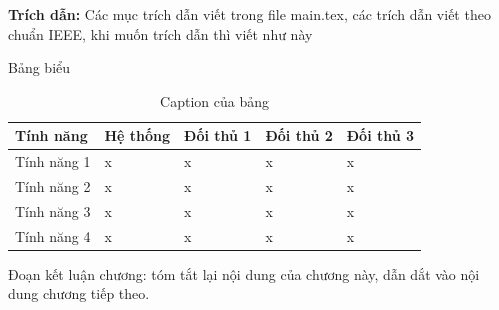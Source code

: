\FloatBarrier

\vspace{1cm}

\textbf{Trích dẫn:} Các mục trích dẫn viết trong file main.tex, các trích dẫn viết theo chuẩn IEEE, khi muốn trích dẫn thì viết như này \cite{Cockburn2005}



\begin{landscape}
	\noindent Bảng biểu

	\begin{longtable}{|>{\raggedright\arraybackslash}m{4cm}|>{\raggedright\arraybackslash}m{4.5cm}|>{\raggedright\arraybackslash}m{4.5cm}|>{\raggedright\arraybackslash}m{4.5cm}|>{\raggedright\arraybackslash}m{4.5cm}|}
	\caption{Caption của bảng} \\
	\hline
	\textbf{Tính năng} & \textbf{Hệ thống} & \textbf{Đối thủ 1} & \textbf{Đối thủ 2} & \textbf{Đối thủ 3} \\
	\hline
	Tính năng 1 & x & x & x & x \\
	\hline
	Tính năng 2 & x & x & x & x \\
	\hline
	Tính năng 3 & x & x & x & x \\
	\hline
	Tính năng 4 & x & x & x & x \\
	\hline

\end{longtable}
\end{landscape}



\vspace{0.3cm}


Đoạn kết luận chương: tóm tắt lại nội dung của chương này, dẫn dắt vào nội dung chương tiếp theo.
